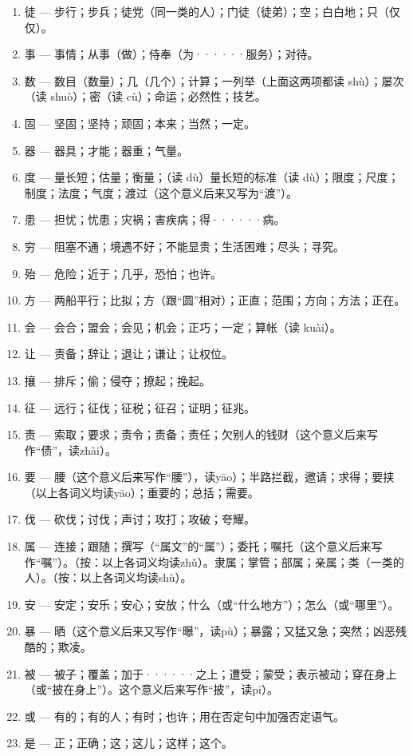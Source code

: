 \begin{enumerate}[label=\textbf{\arabic*. }, start=16]
	\item 徒 --- 步行；步兵；徒党（同一类的人）；门徒（徒弟）；空；白白地；只（仅仅）。
	\item 事 --- 事情；从事（做）；侍奉（为······服务）；对待。
	\item 数 --- 数目（数量）；几（几个）；计算；一列举（上面这两项都读 shù）；屡次（读 shuò）；密（读 cù）；命运；必然性；技艺。
	\item 固 --- 坚固；坚持；顽固；本来；当然；一定。
	\item 器 --- 器具；才能；器重；气量。
	\item 度 --- 量长短；估量；衡量；（读 dù）量长短的标准（读 dù）；限度；尺度；制度；法度；气度；渡过（这个意义后来又写为“渡”）。
	\item 患 --- 担忧；忧患；灾祸；害疾病；得······病。
	\item 穷 --- 阻塞不通；境遇不好；不能显贵；生活困难；尽头；寻究。
	\item 殆 --- 危险；近于；几乎，恐怕；也许。
	\item 方 --- 两船平行；比拟；方（跟“圆”相对）；正直；范围；方向；方法；正在。
	\item 会 --- 会合；盟会；会见；机会；正巧；一定；算帐（读 kuài）。
	\item 让 --- 责备；辞让；退让；谦让；让权位。
	\item 攘 --- 排斥；偷；侵夺；撩起；挽起。
	\item 征 --- 远行；征伐；征税；征召；证明；征兆。
	\item 责 --- 索取；要求；责令；责备；责任；欠别人的钱财（这个意义后来写作“债”，读zhài）。
	\item 要 --- 腰（这个意义后来写作“腰”），读yāo）；半路拦截，邀请；求得；要挟（以上各词义均读yāo）；重要的；总括；需要。
	\item 伐 --- 砍伐；讨伐；声讨；攻打；攻破；夸耀。
	\item 属 --- 连接；跟随；撰写（“属文”的“属”）；委托；嘱托（这个意义后来写作“嘱”）。（按：以上各词义均读zhǔ）。隶属；掌管；部属；亲属；类（一类的人）。（按：以上各词义均读shù）。
	\item 安 --- 安定；安乐；安心；安放；什么（或“什么地方”）；怎么（或“哪里”）。
	\item 暴 --- 晒（这个意义后来又写作“曝”，读pù）；暴露；又猛又急；突然；凶恶残酷的；欺凌。
	\item 被 --- 被子；覆盖；加于······之上；遭受；蒙受；表示被动；穿在身上（或“披在身上”）。这个意义后来写作“披”，读pī）。
	\item 或 --- 有的；有的人；有时；也许；用在否定句中加强否定语气。
	\item 是 --- 正；正确；这；这儿；这样；这个。
\end{enumerate}
\newpage